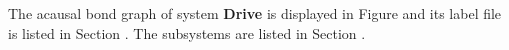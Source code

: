 

   The acausal bond graph of system \textbf{Drive} is
   displayed in Figure  and its label
   file is listed in Section .
   The subsystems are listed in Section .
